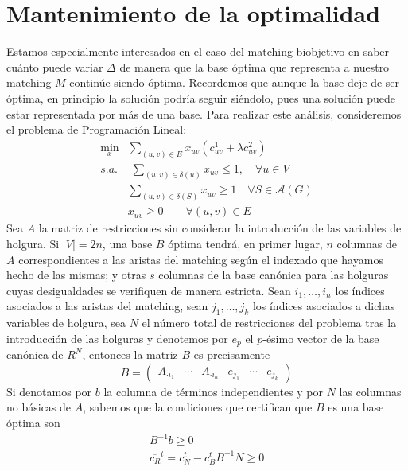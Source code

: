 \documentclass[twoside,a4paper,openright,12pt,tikz]{book}
\begin{document}
\section{Mantenimiento de la optimalidad}
Estamos especialmente interesados en el caso del matching biobjetivo en saber cuánto puede variar $\Delta$ de manera que la base óptima que representa a nuestro matching $M$ continúe siendo óptima. Recordemos que aunque la base deje de ser óptima, en principio la solución podría seguir siéndolo, pues una solución puede estar representada por más de una base. Para realizar este análisis, consideremos el problema de Programación Lineal:
\begin{align*}
\min_x & \sum_{(u,v) \in E}x_{uv}(c^1_{uv} + \lambda c^2_{uv})\\
s.a.&\;\sum_{(u,v)\in\delta(u)} x_{uv} \leq 1, \quad \forall u \in V\\
&\sum_{(u,v)\in \delta(S)} x_{uv} \geq 1\quad \forall S \in \mathcal{A}(G)	\\
&x_{uv} \geq 0 \qquad \forall(u,v)\in E
\end{align*}
Sea $A$ la matriz de restricciones sin considerar la introducción de las variables de holgura. Si $|V|=2n$, una base $B$ óptima tendrá, en primer lugar, $n$ columnas de $A$ correspondientes a las aristas del matching según el indexado que hayamos hecho de las mismas; y otras $s$ columnas de la base canónica para las holguras cuyas desigualdades se verifiquen de manera estricta. Sean $i_1,\dotsc,i_n$ los índices asociados a las aristas del matching, sean $j_1,\dotsc,j_k$ los índices asociados a dichas variables de holgura, sea $N$ el número total de restricciones del problema tras la introducción de las holguras y denotemos por $e_p$ el $p$-ésimo vector de la base canónica de $R^N$, entonces la matriz $B$ es precisamente
$$ B= 
\begin{pmatrix}
A_{\cdot i_1} & \cdots & A_{\cdot i_n} & e_{j_1} & \cdots & e_{j_k}
\end{pmatrix}
$$
Si denotamos por $b$ la columna de términos independientes y por $N$ las columnas no básicas de $A$, sabemos que la condiciones que certifican que $B$ es una base óptima son
\begin{align*}
B^{-1}b\geq0\\
\overline{c_R}^t = c_N^t - c_B^t B^{-1}N\geq 0
\end{align*}
\end{document}
